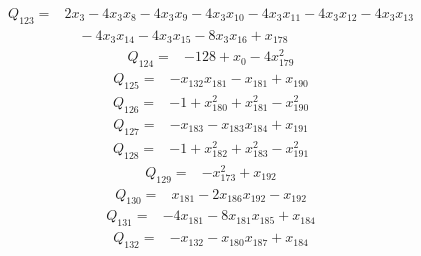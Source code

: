 \begin{equation*}\begin{split}
Q_{123}={}&2x_{3} - 4x_{3} x_{8} - 4x_{3} x_{9} - 4x_{3} x_{10} - 4x_{3} x_{11} - 4x_{3} x_{12} - 4x_{3} x_{13}\\
&\quad -4x_{3} x_{14} - 4x_{3} x_{15} - 8x_{3} x_{16} + x_{178}
\end{split}\end{equation*}
\begin{equation*}\begin{split}
Q_{124}={}&-128 + x_{0} - 4x_{179}^{2}
\end{split}\end{equation*}
\begin{equation*}\begin{split}
Q_{125}={}&-x_{132} x_{181} - x_{181} + x_{190}
\end{split}\end{equation*}
\begin{equation*}\begin{split}
Q_{126}={}&-1 + x_{180}^{2} + x_{181}^{2} - x_{190}^{2}
\end{split}\end{equation*}
\begin{equation*}\begin{split}
Q_{127}={}&-x_{183} - x_{183} x_{184} + x_{191}
\end{split}\end{equation*}
\begin{equation*}\begin{split}
Q_{128}={}&-1 + x_{182}^{2} + x_{183}^{2} - x_{191}^{2}
\end{split}\end{equation*}
\begin{equation*}\begin{split}
Q_{129}={}&-x_{173}^{2} + x_{192}
\end{split}\end{equation*}
\begin{equation*}\begin{split}
Q_{130}={}&x_{181} - 2x_{186} x_{192} - x_{192}
\end{split}\end{equation*}
\begin{equation*}\begin{split}
Q_{131}={}&-4x_{181} - 8x_{181} x_{185} + x_{184}
\end{split}\end{equation*}
\begin{equation*}\begin{split}
Q_{132}={}&-x_{132} - x_{180} x_{187} + x_{184}
\end{split}\end{equation*}
